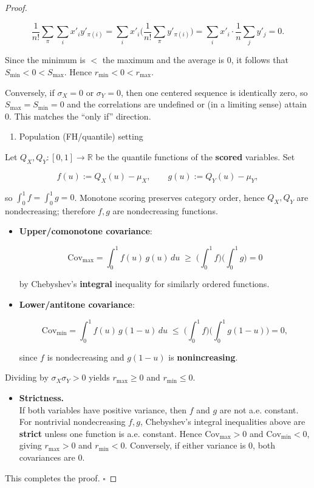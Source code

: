 \documentclass[
  letterpaper,
  DIV=11,
  numbers=noendperiod]{scrartcl}
\providecommand{\tightlist}{%
  \setlength{\itemsep}{0pt}\setlength{\parskip}{0pt}}
\theoremstyle{remark}
\begin{document}
\begin{proof}
\begin{itemize}
  \[\frac1{n!}\sum_{\pi}\sum_i x'_i y'_{\pi(i)}  
    = \sum_i x'_i \Big(\frac1{n!}\sum_{\pi} y'_{\pi(i)}\Big)  
    = \sum_i x'_i \cdot \frac1n\sum_j y'_j  
    = 0.\]

  Since the minimum is \(<\) the maximum and the average is \(0\), it
  follows that \(S_{\min}<0<S_{\max}\). Hence \(r_{\min}<0<r_{\max}\).

  Conversely, if \(\sigma_X=0\) or \(\sigma_Y=0\), then one centered
  sequence is identically zero, so \(S_{\max}=S_{\min}=0\) and the
  correlations are undefined or (in a limiting sense) attain 0. This
  matches the ``only if'' direction.
\end{itemize}

\begin{enumerate}
\def\labelenumi{\Alph{enumi})}
\setcounter{enumi}{1}
\tightlist
\item
  Population (FH/quantile) setting
\end{enumerate}

Let \(Q_X, Q_Y : [0,1]\to\mathbb{R}\) be the quantile functions of the
\textbf{scored} variables. Set

\[f(u):=Q_X(u)-\mu_X,\qquad g(u):=Q_Y(u)-\mu_Y,\]

so \(\int_0^1 f=\int_0^1 g=0\). Monotone scoring preserves category
order, hence \(Q_X, Q_Y\) are nondecreasing; therefore \(f, g\) are
nondecreasing functions.

\begin{itemize}
\item
  \textbf{Upper/comonotone covariance}:

  \[\mathrm{Cov}_{\max}=\int_0^1 f(u)\,g(u)\,du \;\ge\; \Big(\int_0^1 f\Big)\Big(\int_0^1 g\Big)=0\]

  by Chebyshev's \textbf{integral} inequality for similarly ordered
  functions.
\item
  \textbf{Lower/antitone covariance}:

  \[\mathrm{Cov}_{\min}=\int_0^1 f(u)\,g(1-u)\,du \;\le\; \Big(\int_0^1 f\Big)\Big(\int_0^1 g(1-u)\Big)=0,\]

  since \(f\) is nondecreasing and \(g(1-u)\) is \textbf{nonincreasing}.
\end{itemize}

Dividing by \(\sigma_X\sigma_Y>0\) yields \(r_{\max}\ge 0\) and
\(r_{\min}\le 0\).

\begin{itemize}
\tightlist
\item
  \textbf{Strictness.}\\
  If both variables have positive variance, then \(f\) and \(g\) are not
  a.e. constant. For nontrivial nondecreasing \(f,g\), Chebyshev's
  integral inequalities above are \textbf{strict} unless one function is
  a.e. constant. Hence \(\mathrm{Cov}_{\max}>0\) and
  \(\mathrm{Cov}_{\min}<0\), giving \(r_{\max}>0\) and \(r_{\min}<0\).
  Conversely, if either variance is \(0\), both covariances are \(0\).
\end{itemize}

This completes the proof. \(\square\)
\end{proof}
\end{document}
